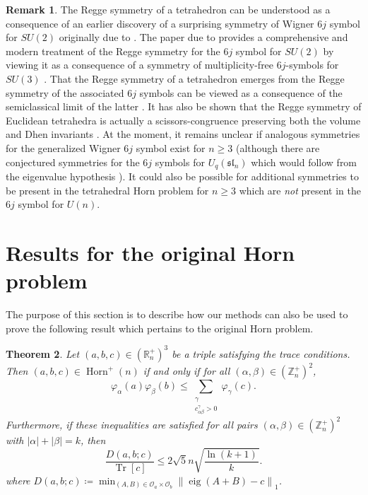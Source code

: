 \documentclass[pdflatex, sn-mathphys-num]{sn-jnl} %
\let\oldciteauthor=\citeauthor
\def\citeauthor#1{\hypersetup{citecolor=black}\oldciteauthor{#1}\hypersetup{citecolor=blue}}
\theoremstyle{plain}
\newtheorem{thm}{Theorem}%
\theoremstyle{definition}
\newtheorem{rem}[thm]{Remark}%
\def\hypersetup#1{}%
\DeclareMathOperator{\Tr}{Tr}
\DeclareMathOperator{\Horn}{Horn}
\DeclareMathOperator{\eig}{eig}
\newcommand{\orbit}{\mathcal O}
\newcommand{\polyk}[1]{(k\!+\!1)^{#1}}
\newcommand{\norm}[1]{\left\lVert#1\right\rVert}
\newcommand{\undomweightsp}[1]{\mathbb Z^{+}_{#1}}
\newcommand{\eigsp}[1]{\mathbb R^{+}_{#1}}
\newcommand{\vp}{\varphi} %
\newcommand{\ea}{a}
\newcommand{\eb}{b}
\newcommand{\ec}{c}
\newcommand{\tec}{\Tr[\ec]}
\newcommand{\ya}{\alpha}
\newcommand{\yb}{\beta}
\newcommand{\yc}{\gamma}
\newcommand{\sya}{|\ya|}
\newcommand{\syb}{|\yb|}
\begin{document}
\begin{rem}
    The Regge symmetry of a tetrahedron can be understood as a consequence of an earlier discovery of a surprising symmetry of Wigner $6j$ symbol for $SU(2)$ originally due to \citeauthor{regge1959symmetry} \cite{regge1959symmetry}.
    The paper due to \citeauthor{boalch2007regge} provides a comprehensive and modern treatment of the Regge symmetry for the $6j$ symbol for $SU(2)$ by viewing it as a consequence of a symmetry of multiplicity-free $6j$-symbols for $SU(3)$ \cite{boalch2007regge}.
    That the Regge symmetry of a tetrahedron emerges from the Regge symmetry of the associated $6j$ symbols can be viewed as a consequence of the semiclassical limit of the latter \cite{ponzano1968semiclassical,roberts1999classical}.
    It has also be shown that the Regge symmetry of Euclidean tetrahedra is actually a scissors-congruence preserving both the volume and Dhen invariants \cite{akopyan2019regge}.
    At the moment, it remains unclear if analogous symmetries for the generalized Wigner $6j$ symbol exist for $n \geq 3$ (although there are conjectured symmetries for the $6j$ symbols for $U_q(\mathfrak{sl}_n)$ which would follow from the eigenvalue hypothesis \cite{morozov2018new,lanina2023tug}).
    It could also be possible for additional symmetries to be present in the tetrahedral Horn problem for $n \geq 3$ which are \textit{not} present in the $6j$ symbol for $U(n)$.
\end{rem}


\section{Results for the original Horn problem}
\label{sec:new_ineq_horn_orig}

The purpose of this section is to describe how our methods can also be used to prove the following result which pertains to the original Horn problem.

\begin{thm}
    \label{thm:tri_iff}
    Let $(\ea,\eb,\ec) \in (\eigsp{n})^3$ be a triple satisfying the trace conditions.
    Then $(\ea,\eb,\ec) \in \Horn^{+}(n)$ if and only if for all $(\ya,\yb) \in (\undomweightsp{n})^2$,
    \begin{equation}
        \label{eq:tri_iff}
        \vp_{\ya}(\ea)\vp_{\yb}(\eb)
        \leq \sum_{\substack{\yc\\c^{\yc}_{\ya\yb} > 0}} \vp_{\yc}(\ec).
    \end{equation}
    Furthermore, if these inequalities are satisfied for all pairs $(\ya,\yb) \in (\undomweightsp{n})^2$ with $\sya + \syb = k$, then
    \begin{equation}
        \label{eq:tri_dist_bound}
        \frac{D(\ea,\eb;\ec)}{\tec} \leq 2 \sqrt{5} n \sqrt{\frac{\ln \polyk{}}{k}}.
    \end{equation}
    where $D(\ea,\eb;\ec)\coloneqq \min_{(A,B) \in \orbit_\ea \times \orbit_\eb} \norm{\eig(A+B)-\ec}_{1}$.
\end{thm}
\end{document}

